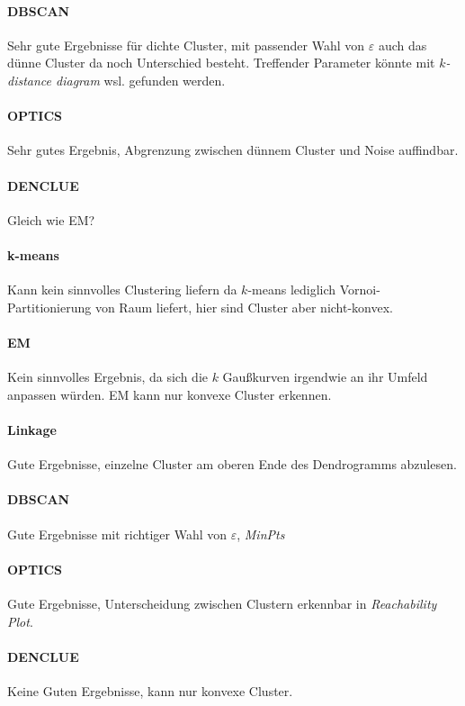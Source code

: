 \documentclass[10pt]{article} %
\begin{document}
\paragraph{DBSCAN} Sehr gute Ergebnisse für dichte Cluster, mit passender Wahl
von $\varepsilon$ auch das dünne Cluster da noch Unterschied besteht. Treffender
Parameter könnte mit \textit{$k$-distance diagram} wsl. gefunden werden.
\paragraph{OPTICS} Sehr gutes Ergebnis, Abgrenzung zwischen dünnem Cluster und
Noise auffindbar.
\paragraph{DENCLUE} Gleich wie EM?

\newpage

\paragraph{k-means} Kann kein sinnvolles Clustering liefern da $k$-means
lediglich Vornoi-Partitionierung von Raum liefert, hier sind Cluster aber
nicht-konvex.
\paragraph{EM} Kein sinnvolles Ergebnis, da sich die $k$ Gaußkurven irgendwie an
ihr Umfeld anpassen würden. EM kann nur konvexe Cluster erkennen.
\paragraph{Linkage} Gute Ergebnisse, einzelne Cluster am oberen Ende des
Dendrogramms abzulesen.
\paragraph{DBSCAN} Gute Ergebnisse mit richtiger Wahl von $\varepsilon$, \textit{MinPts}
\paragraph{OPTICS} Gute Ergebnisse, Unterscheidung zwischen Clustern erkennbar
in \textit{Reachability Plot}.
\paragraph{DENCLUE} Keine Guten Ergebnisse, kann nur konvexe Cluster.
\end{document}
